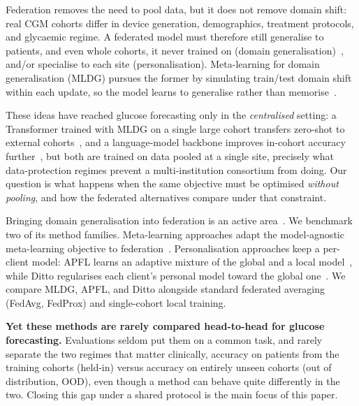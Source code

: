 \documentclass[10pt,letterpaper]{article}
\begin{document}
Federation removes the need to pool data, but it does not remove domain
shift: real CGM cohorts differ in device generation, demographics,
treatment protocols, and glycaemic regime. A federated model must therefore
still generalise to patients, and even whole cohorts, it never trained on
(domain generalisation)~\cite{zhou2022dgsurvey}, and/or specialise to each
site (personalisation). Meta-learning for domain generalisation (MLDG)
pursues the former by simulating train/test domain shift within each
update, so the model learns to generalise rather than
memorise~\cite{li2018mldg}.

These ideas have reached glucose forecasting only in the \emph{centralised}
setting: a Transformer trained with MLDG on a single large cohort transfers
zero-shot to external cohorts~\cite{zhu2024gpformer}, and a language-model
backbone improves in-cohort accuracy further~\cite{zhu2026glullm}, but both
are trained on data pooled at a single site, precisely what
data-protection regimes prevent a multi-institution consortium from doing.
Our question is what happens when the same objective must be optimised
\emph{without pooling}, and how the federated alternatives compare under
that constraint.

Bringing domain generalisation into federation is an active
area~\cite{li2025fedDGsurvey}. We benchmark two of its method families.
Meta-learning approaches adapt the model-agnostic meta-learning objective
to federation~\cite{chen2018fedmeta,fallah2020perfedavg}. Personalisation
approaches keep a per-client model: APFL learns an adaptive mixture of the
global and a local model~\cite{deng2020apfl}, while Ditto regularises each
client's personal model toward the global one~\cite{li2021ditto}. We
compare MLDG, APFL, and Ditto alongside standard federated averaging
(FedAvg, FedProx) and single-cohort local training.

\textbf{Yet these methods are rarely compared head-to-head for glucose
forecasting.} Evaluations seldom put them on a common task, and rarely
separate the two regimes that matter clinically, accuracy on patients from
the training cohorts (held-in) versus accuracy on entirely unseen cohorts
(out of distribution, OOD), even though a method can behave quite
differently in the two. Closing this gap under a shared protocol is the
main focus of this paper.
\end{document}
